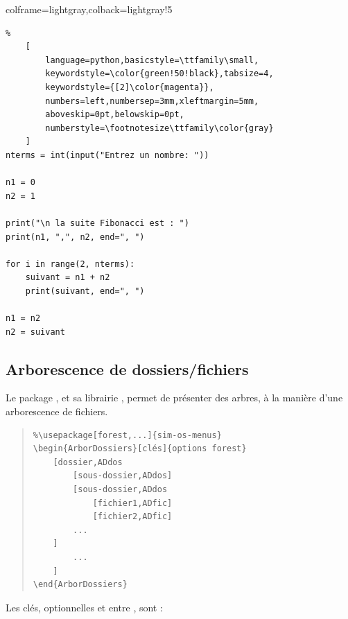 \documentclass[11pt,a4paper]{ltxdoc}
\begin{document}
\begin{tcblisting}{colframe=lightgray,colback=lightgray!5}
\begin{VisionnPY}[Largeur=12cm]{}
\begin{lstlisting}%
    [
        language=python,basicstyle=\ttfamily\small,
        keywordstyle=\color{green!50!black},tabsize=4,
        keywordstyle={[2]\color{magenta}},
        numbers=left,numbersep=3mm,xleftmargin=5mm,
        aboveskip=0pt,belowskip=0pt,
        numberstyle=\footnotesize\ttfamily\color{gray}
    ]
nterms = int(input("Entrez un nombre: "))

n1 = 0
n2 = 1

print("\n la suite Fibonacci est : ")
print(n1, ",", n2, end=", ")

for i in range(2, nterms):
    suivant = n1 + n2
    print(suivant, end=", ")

n1 = n2
n2 = suivant
\end{lstlisting}
\end{VisionnPY}
\end{tcblisting}

\pagebreak

\subsection{Arborescence de dossiers/fichiers}

Le package , et sa librairie , permet de présenter des arbres, à la manière d'une arborescence de fichiers.

\begin{quote}
\begin{verbatim}
%\usepackage[forest,...]{sim-os-menus}
\begin{ArborDossiers}[clés]{options forest}
    [dossier,ADdos
        [sous-dossier,ADdos]
        [sous-dossier,ADdos
            [fichier1,ADfic]
            [fichier2,ADfic]
        ...
    ]
        ...
    ]
\end{ArborDossiers}
\end{verbatim}
\end{quote}

Les \textsf{clés}, optionnelles et entre \MontreCode{[...]}, sont :
\end{document}

